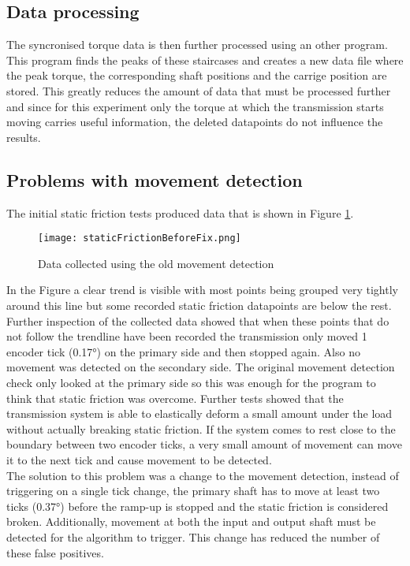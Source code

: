 \documentclass[12pt]{article}
\begin{document}
\subsection{Data processing}
The syncronised torque data is then further processed using an other program. This program finds the peaks of these staircases and creates a new data file where the peak torque, the corresponding shaft positions and the carrige position are stored. This greatly reduces the amount of data that must be processed further and since for this experiment only the torque at which the transmission starts moving carries useful information, the deleted datapoints do not influence the results. 


\subsection{Problems with movement detection}
The initial static friction tests produced data that is shown in Figure \ref{fig:beforeFix}.  

\begin{figure}[h]
    \centering
    \texttt{[image: staticFrictionBeforeFix.png]}
    \caption{Data collected using the old movement detection}
    \label{fig:beforeFix}
\end{figure}

In the Figure a clear trend is visible with most points being grouped very tightly around this line but some recorded static friction datapoints are below the rest. Further inspection of the collected data showed that when these points that do not follow the trendline have been recorded the transmission only moved 1 encoder tick (0.17°) on the primary side and then stopped again. Also no movement was detected on the secondary side. The original movement detection check only looked at the primary side so this was enough for the program to think that static friction was overcome. Further tests showed that the transmission system is able to elastically deform a small amount under the load without actually breaking static friction. If the system comes to rest close to the boundary between two encoder ticks, a very small amount of movement can move it to the next tick and cause movement to be detected.\\

The solution to this problem was a change to the movement detection, instead of triggering on a single tick change, the primary shaft has to move at least two ticks (0.37°) before the ramp-up is stopped and the static friction is considered broken. Additionally, movement at both the input and output shaft must be detected for the algorithm to trigger. This change has reduced the number of these false positives. 
\end{document}
